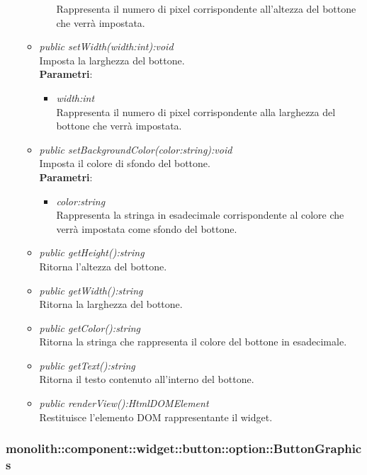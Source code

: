 \begin{itemize}
\begin{itemize}
\begin{itemize}
		Rappresenta il numero di pixel corrispondente all'altezza del bottone che verrà impostata.
		\end{itemize}
	\item \textit{public setWidth(width:int):void}\\
	Imposta la larghezza del bottone.
		\\ \textbf{Parametri}: \begin{itemize}
		\item \textit{width:int}\\
		Rappresenta il numero di pixel corrispondente alla larghezza del bottone che verrà impostata.
		\end{itemize}
	\item \textit{public setBackgroundColor(color:string):void}\\
	Imposta il colore di sfondo del bottone.
		\\ \textbf{Parametri}: \begin{itemize}
		\item \textit{color:string}\\
		Rappresenta la stringa in esadecimale corrispondente al colore che verrà impostata come sfondo del bottone.
		\end{itemize}
	\item \textit{public getHeight():string}\\
	Ritorna l'altezza del bottone.
	\item \textit{public getWidth():string}\\
	Ritorna la larghezza del bottone.
	\item \textit{public getColor():string}\\
	Ritorna la stringa che rappresenta il colore del bottone in esadecimale.
	\item \textit{public getText():string}\\
	Ritorna il testo contenuto all'interno del bottone.
	\item \textit{public renderView():HtmlDOMElement}\\
	Restituisce l'elemento DOM rappresentante il widget.
	\end{itemize}
\end{itemize}

\subsubsection{monolith::component::widget::button::option::ButtonGraphics}

